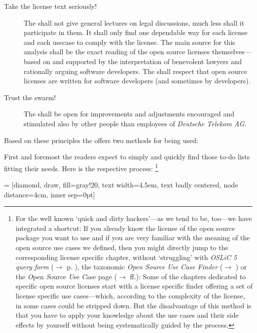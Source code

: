 \begin{description}
  \item[Take the license text seriously!] The \oslic{} shall not give general
  lectures on legal discussions, much less shall it participate in them. It
  shall only find one dependable way for each license and each usecase to comply
  with the license. The main source for this analysis shall be the exact reading
  of the open source licenses themselves---based on and supported by the
  interpretation of benevolent lawyers and rationally arguing software
  developers. The \oslic{} shall respect that open source licenses are written for
  software developers (and sometimes by developers).
  
  \item[Trust the swarm!] The \oslic{} shall be open for improvements and
  adjustments encouraged and stimulated also by other people than employees of
  \emph{Deutsche Telekom AG}.
\end{description}

Based on these principles the \oslic{} offers two methods for being used:

First and foremost the readers expect to simply and quickly find those to-do
lists fitting their needs. Here is the respective process:%
  \footnote{For the well known `quick and dirty hackers'---as we tend to be, 
  too---we have integrated a shortcut: If you already know the license of the 
  open source package you want to use and if you are very familiar with the 
  meaning of the open source use cases we defined, then you might directly 
  jump to the corresponding license specific chapter, without `struggling' 
  with \textit{OSLiC 5 query form} ($\rightarrow$ \oslic{} p. 
  \pageref{OSLiCStandardFormForGatheringInformation}), the taxonomic
  \textit{Open Source Use Case Finder} ($\rightarrow$
  \pageref{OSLiCUseCaseFinder}) or the \textit{O}pen \textit{S}ource \textit{U}se
  \textit{C}ase page ($\rightarrow$ \pageref{OSUCList}ff.): Some of the chapters
  dedicated to specific open source licenses start with a license specific
  finder offering a set of license specific use cases---which, according to the
  complexity of the license, in some cases could be stripped down. But the
  disadvantage of this method is that you have to apply your knowledge about the
  use cases and their side effects by yourself without being systematically guided
  by the \oslic{} process.}

 = [diamond, draw, fill=gray!20, 
    text width=4.5em, text badly centered, node distance=4cm, inner sep=0pt]

